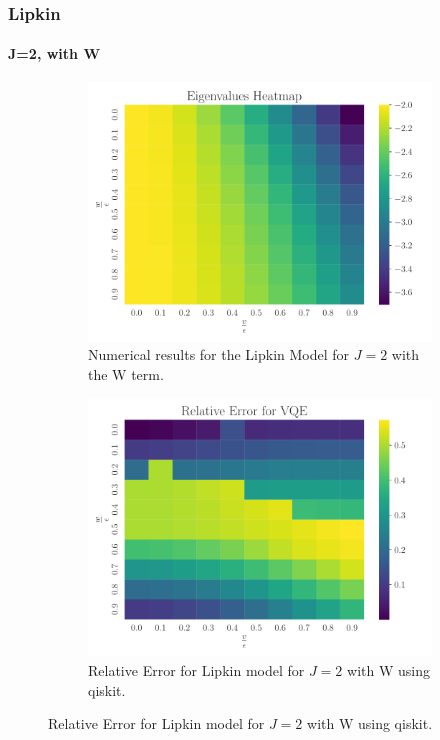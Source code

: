\documentclass{beamer}
\begin{document}
\begin{frame}[t]
	\frametitle{Lipkin}
	\framesubtitle{J=2, with W}
	\begin{figure}[ht]
		\centering
		\begin{subfigure}[b]{0.45\textwidth}
		\begin{center}
			\includegraphics[width=\textwidth]{../src/plots/lipkin-w-eig.pdf}
		\end{center}
		\caption{Numerical results for the Lipkin Model for $ J=2 $ with the W term.}
		\end{subfigure}
		\hfill
		\begin{subfigure}[b]{0.45\textwidth}
		\begin{center}
			\includegraphics[width=\textwidth]{../src/plots/rel-error.pdf}	
		\end{center}
		\caption{Relative Error for Lipkin model for $ J=2 $ with W using qiskit.}
		\label{fig:2-qb-all}
		\end{subfigure}
		\label{fig:2-qb}
	\end{figure}
\end{frame}
\end{document}
